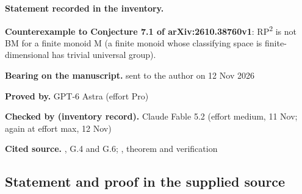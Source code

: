 
\label{nr:entry12}

\noindent\textbf{Statement recorded in the inventory.}\par\smallskip

\textbf{Counterexample to Conjecture 7.1 of arXiv:2610.38760v1}: RP\textsuperscript{2} is not BM for a finite monoid M (a finite monoid whose classifying space is finite-dimensional has trivial universal group).


\noindent\textbf{Bearing on the manuscript.} sent to the author on 12 Nov 2026\par\smallskip

\noindent\textbf{Proved by.} GPT-6 Astra (effort Pro)\par

\noindent\textbf{Checked by (inventory record).} Claude Fable 5.2 (effort medium, 11 Nov; again at effort max, 12 Nov)\par\smallskip

\noindent\textbf{Cited source.} , G.4 and G.6; , theorem and verification\par\medskip

\subsection*{Statement and proof in the supplied source}

